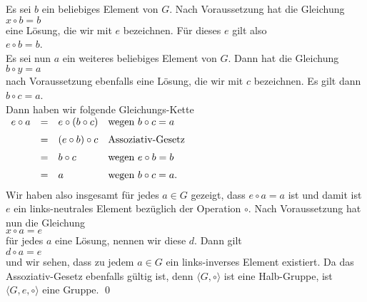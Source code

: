 \proof
Es sei $b$ ein beliebiges Element von $G$.  Nach Voraussetzung hat die Gleichung
\\[0.2cm]
\hspace*{1.3cm}
$x \circ b = b$
\\[0.2cm]
eine L\"{o}sung, die wir mit $e$ bezeichnen.  F\"{u}r dieses $e$ gilt also
\\[0.2cm]
\hspace*{1.3cm}
$e \circ b = b$.
\\[0.2cm]
Es sei nun $a$ ein weiteres beliebiges Element von $G$.  Dann hat die Gleichung
\\[0.2cm]
\hspace*{1.3cm}
$b \circ y = a$
\\[0.2cm]
nach Voraussetzung ebenfalls eine L\"{o}sung, die wir mit $c$ bezeichnen.  Es gilt dann
\\[0.2cm]
\hspace*{1.3cm}
$b \circ c = a$.
\\[0.2cm]
Dann haben wir folgende Gleichungs-Kette
\\[0.2cm]
\hspace*{1.3cm}
$
\begin{array}[t]{lcll}
  e \circ a & = & e \circ (b \circ c)
                & \mbox{wegen $b \circ c = a$}  \\[0.2cm]
            & = & (e \circ b) \circ c
                & \mbox{Assoziativ-Gesetz}  \\[0.2cm]
            & = & b \circ c
                & \mbox{wegen $e \circ b = b$}  \\[0.2cm]
            & = & a
                & \mbox{wegen $b \circ c = a$.}  \\[0.2cm]
\end{array}
$
\\[0.2cm]
Wir haben also insgesamt f\"{u}r jedes $a \in G$ gezeigt, dass $e \circ a = a$ ist und damit ist
$e$ ein links-neutrales Element bez\"{u}glich der Operation $\circ$.  Nach Voraussetzung hat nun 
die Gleichung
\\[0.2cm]
\hspace*{1.3cm}
$x \circ a = e$
\\[0.2cm]
f\"{u}r jedes $a$ eine L\"{o}sung, nennen wir diese $d$.  Dann gilt
\\[0.2cm]
\hspace*{1.3cm}
$d \circ a = e$
\\[0.2cm]
und wir sehen, dass zu jedem $a \in G$ ein links-inverses Element existiert.
Da das Assoziativ-Gesetz ebenfalls g\"{u}ltig ist, denn $\langle G, \circ \rangle$ ist eine Halb-Gruppe,
ist $\langle G, e, \circ \rangle$ eine Gruppe.   \qed

